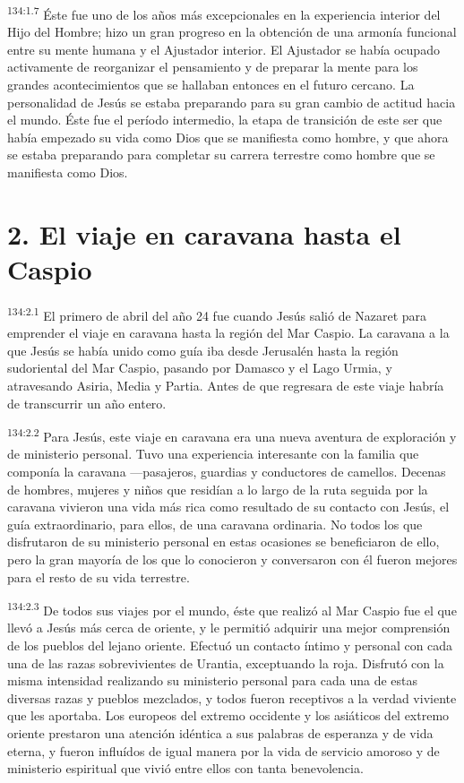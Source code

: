 \par 
\textsuperscript{134:1.7} Éste fue uno de los años más excepcionales en la experiencia interior del Hijo del Hombre; hizo un gran progreso en la obtención de una armonía funcional entre su mente humana y el Ajustador interior. El Ajustador se había ocupado activamente de reorganizar el pensamiento y de preparar la mente para los grandes acontecimientos que se hallaban entonces en el futuro cercano. La personalidad de Jesús se estaba preparando para su gran cambio de actitud hacia el mundo. Éste fue el período intermedio, la etapa de transición de este ser que había empezado su vida como Dios que se manifiesta como hombre, y que ahora se estaba preparando para completar su carrera terrestre como hombre que se manifiesta como Dios.

\section*{2. El viaje en caravana hasta el Caspio}
\par 
\textsuperscript{134:2.1} El primero de abril del año 24 fue cuando Jesús salió de Nazaret para emprender el viaje en caravana hasta la región del Mar Caspio. La caravana a la que Jesús se había unido como guía iba desde Jerusalén hasta la región sudoriental del Mar Caspio, pasando por Damasco y el Lago Urmia, y atravesando Asiria, Media y Partia. Antes de que regresara de este viaje habría de transcurrir un año entero.

\par 
\textsuperscript{134:2.2} Para Jesús, este viaje en caravana era una nueva aventura de exploración y de ministerio personal. Tuvo una experiencia interesante con la familia que componía la caravana ---pasajeros, guardias y conductores de camellos. Decenas de hombres, mujeres y niños que residían a lo largo de la ruta seguida por la caravana vivieron una vida más rica como resultado de su contacto con Jesús, el guía extraordinario, para ellos, de una caravana ordinaria. No todos los que disfrutaron de su ministerio personal en estas ocasiones se beneficiaron de ello, pero la gran mayoría de los que lo conocieron y conversaron con él fueron mejores para el resto de su vida terrestre.

\par 
\textsuperscript{134:2.3} De todos sus viajes por el mundo, éste que realizó al Mar Caspio fue el que llevó a Jesús más cerca de oriente, y le permitió adquirir una mejor comprensión de los pueblos del lejano oriente. Efectuó un contacto íntimo y personal con cada una de las razas sobrevivientes de Urantia, exceptuando la roja. Disfrutó con la misma intensidad realizando su ministerio personal para cada una de estas diversas razas y pueblos mezclados, y todos fueron receptivos a la verdad viviente que les aportaba. Los europeos del extremo occidente y los asiáticos del extremo oriente prestaron una atención idéntica a sus palabras de esperanza y de vida eterna, y fueron influídos de igual manera por la vida de servicio amoroso y de ministerio espiritual que vivió entre ellos con tanta benevolencia.


